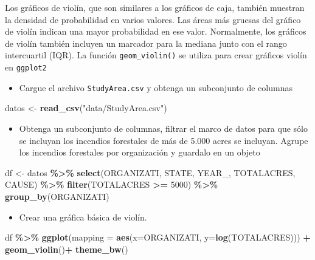 \documentclass[
]{book}
\newenvironment{Shaded}{\begin{snugshade}}{\end{snugshade}}
\newcommand{\AttributeTok}[1]{\textcolor[rgb]{0.13,0.29,0.53}{#1}}
\newcommand{\DecValTok}[1]{\textcolor[rgb]{0.00,0.00,0.81}{#1}}
\newcommand{\FunctionTok}[1]{\textcolor[rgb]{0.13,0.29,0.53}{\textbf{#1}}}
\newcommand{\NormalTok}[1]{#1}
\newcommand{\OtherTok}[1]{\textcolor[rgb]{0.56,0.35,0.01}{#1}}
\newcommand{\SpecialCharTok}[1]{\textcolor[rgb]{0.81,0.36,0.00}{\textbf{#1}}}
\newcommand{\StringTok}[1]{\textcolor[rgb]{0.31,0.60,0.02}{#1}}
\providecommand{\tightlist}{%
  \setlength{\itemsep}{0pt}\setlength{\parskip}{0pt}}
\begin{document}
Los gráficos de violín, que son similares a los gráficos de caja, también muestran la densidad de probabilidad en varios valores. Las áreas más gruesas del gráfico de violín indican una mayor probabilidad en ese valor. Normalmente, los gráficos de violín también incluyen un marcador para la mediana junto con el rango intercuartil (IQR). La función \texttt{geom\_violin()} se utiliza para crear gráficos violín en \texttt{ggplot2}

\begin{itemize}
\tightlist
\item
  Cargue el archivo \texttt{StudyArea.csv} y obtenga un subconjunto de columnas
\end{itemize}

\begin{Shaded}
\begin{Highlighting}[]
\NormalTok{datos }\OtherTok{\textless{}{-}} \FunctionTok{read\_csv}\NormalTok{(}\StringTok{"data/StudyArea.csv"}\NormalTok{)}
\end{Highlighting}
\end{Shaded}

\begin{itemize}
\tightlist
\item
  Obtenga un subconjunto de columnas, filtrar el marco de datos para que sólo se incluyan los incendios forestales de más de 5.000 acres se incluyan. Agrupe los incendios forestales por organización y guardalo en un objeto
\end{itemize}

\begin{Shaded}
\begin{Highlighting}[]
\NormalTok{df }\OtherTok{\textless{}{-}}\NormalTok{ datos }\SpecialCharTok{\%\textgreater{}\%} 
  \FunctionTok{select}\NormalTok{(ORGANIZATI, STATE, YEAR\_, TOTALACRES, CAUSE) }\SpecialCharTok{\%\textgreater{}\%} 
  \FunctionTok{filter}\NormalTok{(TOTALACRES }\SpecialCharTok{\textgreater{}=} \DecValTok{5000}\NormalTok{) }\SpecialCharTok{\%\textgreater{}\%} 
  \FunctionTok{group\_by}\NormalTok{(ORGANIZATI)}
\end{Highlighting}
\end{Shaded}

\begin{itemize}
\tightlist
\item
  Crear una gráfica básica de violín.
\end{itemize}

\begin{Shaded}
\begin{Highlighting}[]
\NormalTok{df }\SpecialCharTok{\%\textgreater{}\%} 
  \FunctionTok{ggplot}\NormalTok{(}\AttributeTok{mapping =} \FunctionTok{aes}\NormalTok{(}\AttributeTok{x=}\NormalTok{ORGANIZATI, }\AttributeTok{y=}\FunctionTok{log}\NormalTok{(TOTALACRES))) }\SpecialCharTok{+}
  \FunctionTok{geom\_violin}\NormalTok{()}\SpecialCharTok{+}
  \FunctionTok{theme\_bw}\NormalTok{()}
\end{Highlighting}
\end{Shaded}
\end{document}
